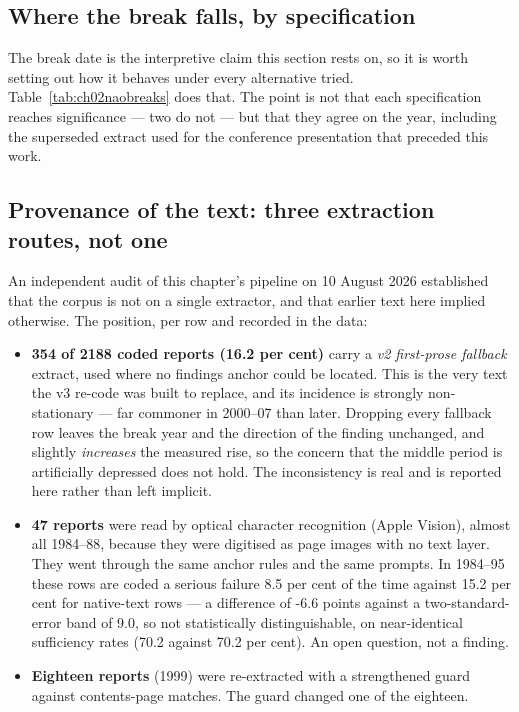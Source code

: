 \subsection*{Where the break falls, by specification}

The break date is the interpretive claim this section rests on, so it is worth setting out how it
behaves under every alternative tried. Table~\ref{tab:ch02naobreaks} does that. The point is not
that each specification reaches significance --- two do not --- but that they agree on the year,
including the superseded extract used for the conference presentation that preceded this work.



\subsection*{Provenance of the text: three extraction routes, not one}

An independent audit of this chapter's pipeline on 10 August 2026 established that the corpus is
not on a single extractor, and that earlier text here implied otherwise. The position, per row and
recorded in the data:

\begin{itemize}
\item \textbf{354 of 2188 coded reports (16.2 per cent)} carry a \emph{v2 first-prose
fallback} extract, used where no findings anchor could be located. This is the very text the v3
re-code was built to replace, and its incidence is strongly non-stationary --- far commoner in
2000--07 than later. Dropping every fallback row leaves the break year and the direction of the
finding unchanged, and slightly \emph{increases} the measured rise, so the concern that the middle
period is artificially depressed does not hold. The inconsistency is real and is reported here
rather than left implicit.
\item \textbf{47 reports} were read by optical character recognition (Apple Vision), almost all
1984--88, because they were digitised as page images with no text layer. They went through the
same anchor rules and the same prompts. In 1984--95 these rows are coded a serious failure
8.5 per cent of the time against 15.2 per cent for native-text rows --- a difference of
-6.6 points against a two-standard-error band of 9.0, so not statistically distinguishable, on
near-identical sufficiency rates (70.2 against 70.2 per cent). An open question, not a finding.
\item \textbf{Eighteen reports} (1999) were re-extracted with a strengthened guard against
contents-page matches. The guard changed one of the eighteen.
\end{itemize}

